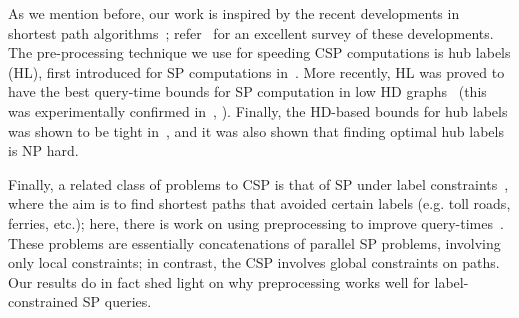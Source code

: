 As we mention before, our work is inspired by the recent developments in shortest path algorithms~\cite{highway2013,hubimplem,highway2010,dimacs09,geisberger_ch_definition,skeleton}; refer~\cite{goldberg_survey} for an excellent survey of these developments. 
The pre-processing technique we use for speeding CSP computations is hub labels (HL), first introduced for SP computations in~\cite{cohen_definition_hl}. 
More recently, HL was proved to have the best query-time bounds for SP computation in low HD graphs~\cite{highway2013,highway2010} (this was experimentally confirmed in~\cite{hubimplem}, \cite[Figure 7]{goldberg_survey}).  
Finally, the HD-based bounds for hub labels was shown to be tight in~\cite{babenko_hl_complexity,white_complexity_hd}, and it was also shown that finding optimal hub labels is NP hard.

Finally, a related class of problems to CSP is that of SP under label constraints~\cite{language_csp}, where the aim is to find shortest paths that avoided certain labels (e.g. toll roads, ferries, etc.); here, there is work on using preprocessing to improve query-times~\cite{rice_csp}.
These problems are essentially concatenations of parallel SP problems, involving only local constraints; in contrast, the CSP involves global constraints on paths.
Our results do in fact shed light on why preprocessing works well for label-constrained SP queries.